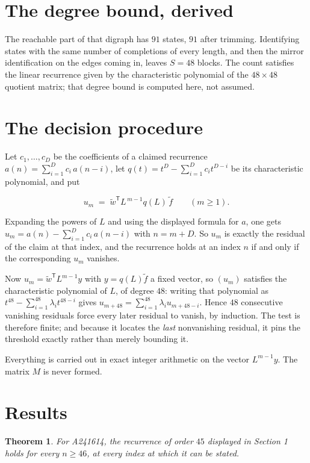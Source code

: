 \documentclass[11pt]{article}
\newtheorem{theorem}{Theorem}
\theoremstyle{definition}
\begin{document}
\section{The degree bound, derived}

The reachable part of that digraph has $91$ states, $91$ after trimming. Identifying states with the same number of completions of every length, and then the mirror identification on the edges coming in, leaves $S = 48$ blocks. The count satisfies the linear recurrence given by the characteristic polynomial of the $48\times48$ quotient matrix; that degree bound is computed here, not assumed.

\section{The decision procedure}

Let $c_1,\dots,c_D$ be the coefficients of a claimed recurrence $a(n) = \sum_{i=1}^{D} c_i\,a(n-i)$, let $q(t) = t^{D} - \sum_{i=1}^{D} c_i t^{D-i}$ be its characteristic polynomial, and put

\[u_m \;=\; \tilde w^{\mathsf T} L^{\,m-1} q(L)\,\tilde f \qquad (m \ge 1).\]

Expanding the powers of $L$ and using the displayed formula for $a$, one gets $u_m = a(n) - \sum_{i=1}^{D} c_i\,a(n-i)$ with $n = m + D$. So $u_m$ is exactly the residual of the claim at that index, and the recurrence holds at an index $n$ if and only if the corresponding $u_m$ vanishes.

Now $u_m = \tilde w^{\mathsf T} L^{m-1} y$ with $y = q(L)\tilde f$ a fixed vector, so $(u_m)$ satisfies the characteristic polynomial of $L$, of degree $48$: writing that polynomial as $t^{48} - \sum_{i=1}^{48} \lambda_i t^{48-i}$ gives $u_{m+48} = \sum_{i=1}^{48} \lambda_i u_{m+48-i}$. Hence $48$ consecutive vanishing residuals force every later residual to vanish, by induction. The test is therefore finite; and because it locates the {\itshape last} nonvanishing residual, it pins the threshold exactly rather than merely bounding it.

Everything is carried out in exact integer arithmetic on the vector $L^{m-1}y$. The matrix $M$ is never formed.

\section{Results}

\begin{theorem} For A241614, the recurrence of order $45$ displayed in Section 1 holds for every $n \ge 46$, at every index at which it can be stated.\end{theorem}
\end{document}
